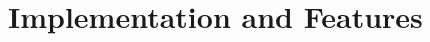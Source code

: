 \documentclass{llncs}
\begin{document}
\cite{ALSD12}

\cite{AD94}

\section{Implementation and Features}

% 	
% 
% 	
% 
% 
% 
% 
% 	
% 	
% 	
% 	
% 	
% 
% 
% 
% 
\end{document}
